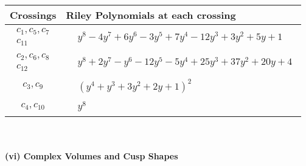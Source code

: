 \documentclass[1p]{elsarticle_modified}
\theoremstyle{definition}
\begin{document}
\begin{tabular}{m{50pt}|m{274pt}}
Crossings & \hspace{64pt}Riley Polynomials at each crossing \\
\hline $$\begin{aligned}c_{1},c_{5},c_{7}\\c_{11}\end{aligned}$$&$\begin{aligned}
&y^8-4 y^7+6 y^6-3 y^5+7 y^4-12 y^3+3 y^2+5 y+1
\end{aligned}$\\
\hline $$\begin{aligned}c_{2},c_{6},c_{8}\\c_{12}\end{aligned}$$&$\begin{aligned}
&y^8+2 y^7- y^6-12 y^5-5 y^4+25 y^3+37 y^2+20 y+4
\end{aligned}$\\
\hline $$\begin{aligned}c_{3},c_{9}\end{aligned}$$&$\begin{aligned}
&(y^4+y^3+3 y^2+2 y+1)^2
\end{aligned}$\\
\hline $$\begin{aligned}c_{4},c_{10}\end{aligned}$$&$\begin{aligned}
&y^8
\end{aligned}$\\
\hline
\end{tabular}\\~\\
\newpage\flushleft \textbf{(vi) Complex Volumes and Cusp Shapes}
\end{document}
